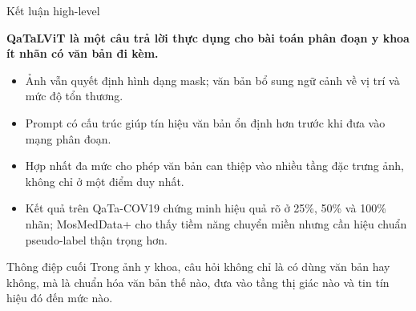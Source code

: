 \documentclass[aspectratio=169,11pt]{beamer}
\newcommand{\reportclaim}[1]{%
  \vspace{0.10cm}
  {\large\bfseries\color{accentblue}#1\par}
  \vspace{0.08cm}
}
\begin{document}
\begin{frame}{Kết luận high-level}
  \reportclaim{QaTaLViT là một câu trả lời thực dụng cho bài toán phân đoạn y khoa ít nhãn có văn bản đi kèm.}
  \begin{itemize}
    \item Ảnh vẫn quyết định hình dạng mask; văn bản bổ sung ngữ cảnh về vị trí và mức độ tổn thương.
    \item Prompt có cấu trúc giúp tín hiệu văn bản ổn định hơn trước khi đưa vào mạng phân đoạn.
    \item Hợp nhất đa mức cho phép văn bản can thiệp vào nhiều tầng đặc trưng ảnh, không chỉ ở một điểm duy nhất.
    \item Kết quả trên QaTa-COV19 chứng minh hiệu quả rõ ở 25\%, 50\% và 100\% nhãn; MosMedData+ cho thấy tiềm năng chuyển miền nhưng cần hiệu chuẩn pseudo-label thận trọng hơn.
  \end{itemize}
  \vspace{0.10cm}
  \begin{block}{Thông điệp cuối}
    Trong ảnh y khoa, câu hỏi không chỉ là có dùng văn bản hay không, mà là chuẩn hóa văn bản thế nào, đưa vào tầng thị giác nào và tin tín hiệu đó đến mức nào.
  \end{block}
\end{frame}
\end{document}
